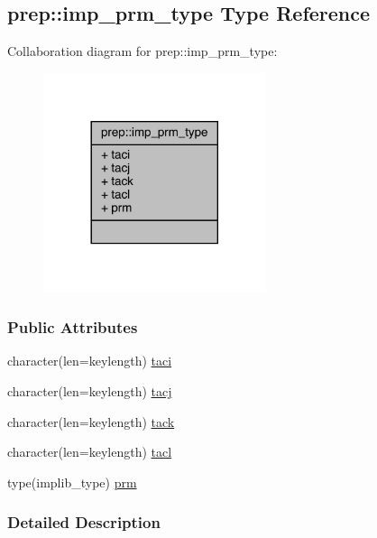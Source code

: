 \hypertarget{structprep_1_1imp__prm__type}{\subsection{prep\-:\-:imp\-\_\-prm\-\_\-type Type Reference}
\label{structprep_1_1imp__prm__type}
}


Collaboration diagram for prep\-:\-:imp\-\_\-prm\-\_\-type\-:
\nopagebreak
\begin{figure}[H]
\begin{center}
\leavevmode
\includegraphics[width=185pt]{structprep_1_1imp__prm__type__coll__graph}
\end{center}
\end{figure}
\subsubsection*{Public Attributes}
\begin{DoxyCompactItemize}
\item 
character(len=keylength) \hyperlink{structprep_1_1imp__prm__type_a40f0c0adcf1d32e0dd4faabdfc94bf50}{taci}
\item 
character(len=keylength) \hyperlink{structprep_1_1imp__prm__type_a35c250f9ceb8bed51a14d5ab60a2bd08}{tacj}
\item 
character(len=keylength) \hyperlink{structprep_1_1imp__prm__type_a46d235de8a5ee1f551e9a8d9636e14f3}{tack}
\item 
character(len=keylength) \hyperlink{structprep_1_1imp__prm__type_aa245b164026d2518756495bcec97a272}{tacl}
\item 
type(implib\-\_\-type) \hyperlink{structprep_1_1imp__prm__type_aadf94e31722728a3f4052f6559131132}{prm}
\end{DoxyCompactItemize}


\subsubsection{Detailed Description}


